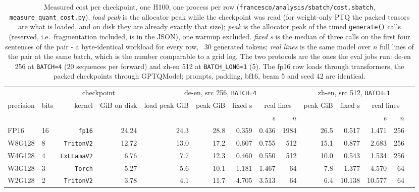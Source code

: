 \begin{table}[t]
\centering
\footnotesize
\setlength{\tabcolsep}{3pt}
\begin{tabular}{llrrrrrrrrrrrr}
\toprule
& & \multicolumn{2}{c}{checkpoint} & \multicolumn{5}{c}{de-en, src 256, \texttt{BATCH=4}} & \multicolumn{4}{c}{zh-en, src 512, \texttt{BATCH=1}} \\
\cmidrule(lr){3-4}\cmidrule(lr){5-9}\cmidrule(lr){10-13}
precision & bits & kernel & GiB on disk & load peak GiB & peak GiB & fixed s & \multicolumn{2}{c}{real lines} & peak GiB & fixed s & \multicolumn{2}{c}{real lines} \\
\cmidrule(lr){8-9}\cmidrule(lr){12-13}
& & & & & & & s & $n$ & & & s & $n$ \\
\midrule
FP16 & 16 & \texttt{fp16} & 24.24 & 24.3 & 28.8 & 0.359 & 0.436 & 1984 & 26.5 & 0.517 & 1.471 & 256 \\
W8G128 & 8 & \texttt{TritonV2} & 12.72 & 13.0 & 17.2 & 0.607 & 0.755 & 512 & 15.1 & 0.877 & 2.683 & 256 \\
W4G128 & 4 & \texttt{ExLLamaV2} & 6.76 & 7.7 & 12.3 & 0.460 & 0.550 & 512 & 10.0 & 0.543 & 1.534 & 256 \\
W3G128 & 3 & \texttt{Torch} & 5.27 & 5.6 & 10.1 & 1.181 & 1.467 & 64 & 7.8 & 1.377 & 4.570 & 64 \\
W2G128 & 2 & \texttt{TritonV2} & 3.78 & 4.1 & 11.7 & 4.705 & 3.513 & 64 & 6.4 & 10.138 & 10.577 & 64 \\
\bottomrule
\end{tabular}
\caption{Measured cost per checkpoint, one H100, one process per row (\texttt{francesco/analysis/sbatch/cost.sbatch}, \texttt{measure\_quant\_cost.py}). \emph{load peak} is the allocator peak while the checkpoint was read (for weight-only PTQ the packed tensors are what is loaded, and on disk they are already exactly that size); \emph{peak} is the allocator peak of the timed \texttt{generate()} calls (reserved, i.e.\ fragmentation included, is in the JSON), one warmup excluded. \emph{fixed s} is the median of three calls on the first four sentences of the pair - a byte-identical workload for every row, ~30 generated tokens; \emph{real lines} is the same model over $n$ full lines of the pair at the same batch, which is the number comparable to a grid log. The two protocols are the ones the eval jobs run: de-en 256 at \texttt{BATCH=4} (20 sequences per forward) and zh-en 512 at \texttt{BATCH\_LONG=1} (5). The fp16 row loads through transformers, the packed checkpoints through GPTQModel; prompts, padding, bf16, beam 5 and seed 42 are identical.}
\label{tab:cost}
\end{table}

